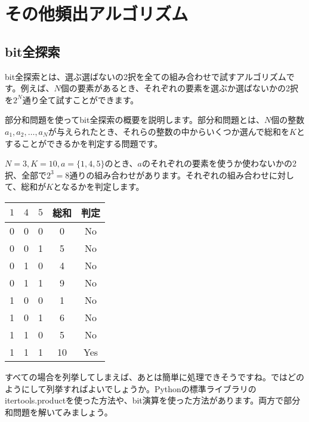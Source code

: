 \section{その他頻出アルゴリズム}
\subsection{bit全探索}
bit全探索とは、選ぶ選ばないの2択を全ての組み合わせで試すアルゴリズムです。例えば、$N$個の要素があるとき、それぞれの要素を選ぶか選ばないかの2択を$2^N$通り全て試すことができます。

部分和問題を使ってbit全探索の概要を説明します。部分和問題とは、$N$個の整数$a_1, a_2, \ldots, a_N$が与えられたとき、それらの整数の中からいくつか選んで総和を$K$とすることができるかを判定する問題です。

$N = 3, K = 10, a = \{1, 4, 5\}$のとき、$a$のそれぞれの要素を使うか使わないかの2択、全部で$2^3 = 8$通りの組み合わせがあります。それぞれの組み合わせに対して、総和が$K$となるかを判定します。

\begin{table}[h]
  \centering
  \begin{tabular}{|c|c|c|c|c|}
    \hline
    $1$ & $4$ & $5$ & 総和 & 判定 \\
    \hline
    0 & 0 & 0 & 0 & No \\
    0 & 0 & 1 & 5 & No \\
    0 & 1 & 0 & 4 & No \\
    0 & 1 & 1 & 9 & No \\
    1 & 0 & 0 & 1 & No \\
    1 & 0 & 1 & 6 & No \\
    1 & 1 & 0 & 5 & No \\
    1 & 1 & 1 & 10 & Yes \\
    \hline
  \end{tabular}
\end{table}

すべての場合を列挙してしまえば、あとは簡単に処理できそうですね。ではどのようにして列挙すればよいでしょうか。Pythonの標準ライブラリの
itertools.productを使った方法や、bit演算を使った方法があります。両方で部分和問題を解いてみましょう。

